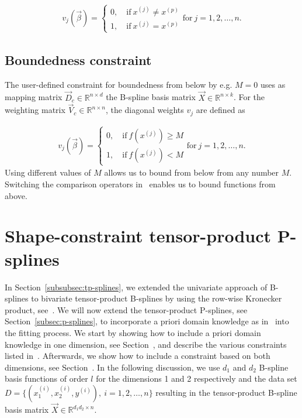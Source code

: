 \begin{align} \label{eq:v_jamming}
	v_j(\vec{\beta}) = 
	\begin{cases}
		0, \quad \text{if} \ x^{(j)} \ne x^{(p)} \\
		1, \quad \text{if} \ x^{(j)} = x^{(p)} 
	\end{cases} \text{for} \ j = 1,2,\dots,n.
\end{align} 

\subsection{Boundedness constraint} \label{subsec:BoudC}

The user-defined constraint for boundedness from below by e.g. $M=0$ uses as mapping matrix $\vec{D}_c \in \mathbb{R}^{n \times d}$ the B-spline basis matrix $\vec{X} \in \mathbb{R}^{n \times k}$. For the weighting matrix $\vec{V}_c \in \mathbb{R}^{n\times n}$, the diagonal weights $v_j$ are defined as

\begin{align} \label{eq:v_boundedness}
	v_j(\vec{\beta}) = \begin{cases} 
		0, \quad \text{if} \ f(x^{(j)}) \ge M\\ 
		1, \quad \text{if} \ f(x^{(j)})  < M 		
	\end{cases} \text{for} \ j=1,2,\dots,n.
\end{align}
%
Using different values of $M$ allows us to bound from below from any number $M$. Switching the comparison operators in~ enables us to bound functions from above. 


\section{Shape-constraint tensor-product P-splines}\label{sec:SCP-tp-splines}

In  Section~\ref{subsubsec:tp-splines}, we extended the univariate approach of B-splines to bivariate tensor-product B-splines by using the row-wise Kronecker product, see~. We will now extend the tensor-product P-splines, see Section~\ref{subsec:p-splines}, to incorporate a priori domain knowledge as in~ into the fitting process. We start by showing how to include a priori domain knowledge in one dimension, see Section~, and describe the various constraints listed in~. Afterwards, we show how to include a constraint based on both dimensions, see Section~. In the following discussion, we use $d_1$ and $d_2$ B-spline basis functions of order $l$ for the dimensions 1 and 2 respectively and the data set $D = \{(x_1^{(i)}, x_2^{(i)}, y^{(i)}), \ i=1,2,\dots,n\}$ resulting in the tensor-product B-spline basis matrix $\vec{X} \in \mathbb{R}^{d_1d_2 \times n}$.

